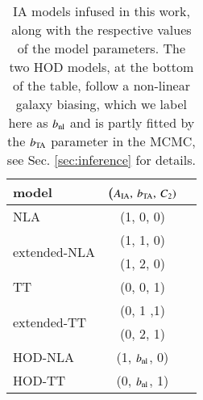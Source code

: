 \begin{table}
   \centering
    \caption{IA models infused in this work, along with the respective values of the model parameters. The two HOD models, at the bottom of the table, follow a non-linear galaxy biasing, which we label here as $b_{\rm nl}$ and is partly fitted by the $b_{\rm TA}$ parameter in the MCMC, see Sec. \ref{sec:inference} for details. }
   \begin{tabular}{@{} lcr @{}} %
      \hline
      \hline

      model   		& ($A_{\rm IA}, \: b_{\rm TA}, \: C_2)$ \\
      \hline
      NLA     		& {(1, 0, 0) }&  \\
      \multirow{2}{*}{extended-NLA }  	&   {(1, 1, 0)}   \\
      							&  {(1, 2, 0)}   \\
      TT 			&  {(0, 0, 1)} &  \\
      \multirow{2}{*}{extended-TT} 	&  {(0, 1 ,1)}   \\
      				&  {(0, 2, 1)}   \\
				HOD-NLA & {(1, $b_{\rm nl}$, 0)} \\
				HOD-TT & {(0, $b_{\rm nl}$, 1)} \\

      \hline
      \hline
   \end{tabular}
   \label{table:IAmodels}
\end{table}
